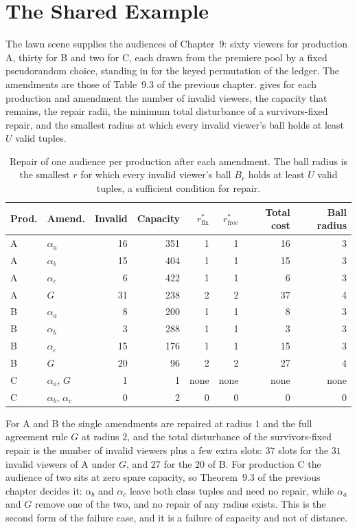 \documentclass[11pt,twoside,openright]{book}
\theoremstyle{plain}
\theoremstyle{definition}
\theoremstyle{remark}
\begin{document}
\section{The Shared Example}\label{sec:witness}

The lawn scene supplies the audiences of Chapter~9: sixty viewers for production A, thirty for B and two for C, each drawn from the premiere pool by a fixed pseudorandom choice, standing in for the keyed permutation of the ledger. The amendments are those of Table~9.3 of the previous chapter.  gives for each production and amendment the number of invalid viewers, the capacity that remains, the repair radii, the minimum total disturbance of a survivors-fixed repair, and the smallest radius at which every invalid viewer's ball holds at least $U$ valid tuples.

\begin{table}[ht]
\centering
\begin{tabular}{@{}llrrrrrr@{}}
\toprule
Prod. & Amend. & Invalid & Capacity & $r^\ast_{\mathrm{fix}}$ & $r^\ast_{\mathrm{free}}$ & Total cost & Ball radius\\
\midrule
A & $\alpha_a$ & 16 & 351 & 1 & 1 & 16 & 3\\
A & $\alpha_b$ & 15 & 404 & 1 & 1 & 15 & 3\\
A & $\alpha_c$ & 6 & 422 & 1 & 1 & 6 & 3\\
A & $G$ & 31 & 238 & 2 & 2 & 37 & 4\\
B & $\alpha_a$ & 8 & 200 & 1 & 1 & 8 & 3\\
B & $\alpha_b$ & 3 & 288 & 1 & 1 & 3 & 3\\
B & $\alpha_c$ & 15 & 176 & 1 & 1 & 15 & 3\\
B & $G$ & 20 & 96 & 2 & 2 & 27 & 4\\
C & $\alpha_a$, $G$ & 1 & 1 & none & none & none & none\\
C & $\alpha_b$, $\alpha_c$ & 0 & 2 & 0 & 0 & 0 & 0\\
\bottomrule
\end{tabular}
\caption{Repair of one audience per production after each amendment. The ball radius is the smallest $r$ for which every invalid viewer's ball $B_r$ holds at least $U$ valid tuples, a sufficient condition for repair.}\label{tab:repair}
\end{table}

For A and B the single amendments are repaired at radius $1$ and the full agreement rule $G$ at radius $2$, and the total disturbance of the survivors-fixed repair is the number of invalid viewers plus a few extra slots: $37$ slots for the $31$ invalid viewers of A under $G$, and $27$ for the $20$ of B. For production C the audience of two sits at zero spare capacity, so Theorem~9.3 of the previous chapter decides it: $\alpha_b$ and $\alpha_c$ leave both class tuples and need no repair, while $\alpha_a$ and $G$ remove one of the two, and no repair of any radius exists. This is the second form of the failure case, and it is a failure of capacity and not of distance.
\end{document}
